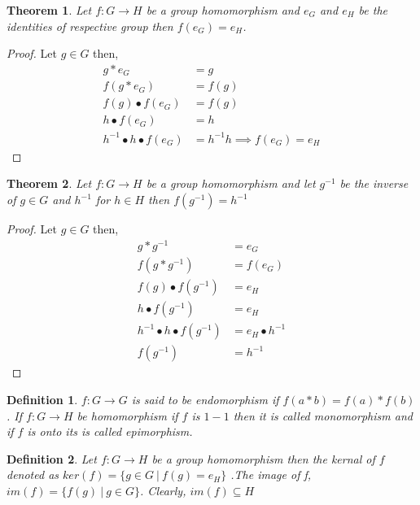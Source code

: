 \documentclass[12pt,a4paper]{article}
\newtheorem{thm}{Theorem}
\newtheorem*{defn}{Definition}
\begin{document}
\begin{thm}
	Let $f: G \to H$ be a group homomorphism and $e_{G}$ and $e_{H}$ be the identities of respective group then $f(e_{G}) = e_{H}$.
\end{thm}
\begin{proof}
	Let $g \in G$ then,
	\begin{align*}
		g*e_{G} &= g \\
		f(g*e_{G}) &= f(g) \\
		f(g)\bullet f(e_{G}) &= f(g) \\
		h \bullet f(e_{G}) &= h \\
		h^{-1} \bullet h \bullet f(e_{G}) &= h^{-1}h \implies f(e_{G}) = e_{H}
	\end{align*}
\end{proof}


\begin{thm}
	Let $f: G \to H$ be a group homomorphism and let $g^{-1}$ be the inverse of $g \in G$ and $h^{-1}$ for $h \in H$ then $f(g^{-1}) = h^{-1}$
\end{thm}
\begin{proof}
	Let $g \in G$ then, 
	\begin{align*}
		g*g^{-1} & = e_{G} \\
		f(g*g^{-1}) & = f(e_{G}) \\
		f(g)\bullet f(g^{-1}) & = e_{H} \\
		h\bullet f(g^{-1}) & = e_{H} \\
		h^{-1}\bullet h\bullet f(g^{-1}) & = e_{H} \bullet h^{-1} \\
		f(g^{-1}) & =  h^{-1}
	\end{align*}
\end{proof}
\begin{defn}
	\normalfont $f: G \to G$ is said to be \textit{endomorphism} if $f(a*b)=f(a)*f(b)$. If $f:G \to H$ be homomorphism if $f$ is $1-1$ then it is called \textit{monomorphism} and if $f$ is onto its is called \textit{epimorphism.}
\end{defn}


\begin{defn} \normalfont
	Let $f: G \to H$ be a group homomorphism then the kernal of $f$ denoted as
		$ker(f) = \{g\in G \:| \: f(g)=e_{H}\}$
	.The \textit{image of f}, $im(f) = \{f(g)\: | \: g\in G\}$. Clearly, $im(f) \subseteq H$
\end{defn}
\end{document}
